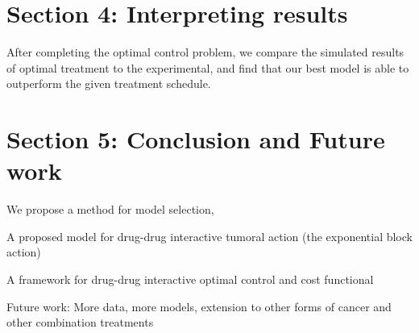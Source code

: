 \documentclass{article}
\begin{document}
\section{Section 4: Interpreting results}


After completing the optimal control problem, we compare the simulated results of optimal treatment to the experimental, and find that our best model is able to outperform the given treatment schedule. 



\section{Section 5: Conclusion and Future work}

We propose a method for model selection, 

A proposed model for drug-drug interactive tumoral action (the exponential block action)

A framework for drug-drug interactive optimal control and cost functional


Future work:
More data, more models, extension to other forms of cancer and other combination treatments
\end{document}
